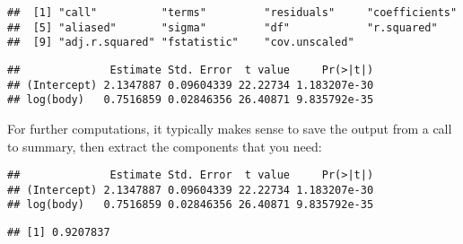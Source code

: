 \documentclass[
]{article}
\newenvironment{Shaded}{\begin{snugshade}}{\end{snugshade}}
\newcommand{\CommentTok}[1]{\textcolor[rgb]{0.56,0.35,0.01}{\textit{#1}}}
\newcommand{\FunctionTok}[1]{\textcolor[rgb]{0.00,0.00,0.00}{#1}}
\newcommand{\NormalTok}[1]{#1}
\newcommand{\OtherTok}[1]{\textcolor[rgb]{0.56,0.35,0.01}{#1}}
\newcommand{\SpecialCharTok}[1]{\textcolor[rgb]{0.00,0.00,0.00}{#1}}
\begin{document}
\begin{verbatim}
##  [1] "call"          "terms"         "residuals"     "coefficients" 
##  [5] "aliased"       "sigma"         "df"            "r.squared"    
##  [9] "adj.r.squared" "fstatistic"    "cov.unscaled"
\end{verbatim}

\begin{Shaded}
\end{Shaded}

\begin{verbatim}
##              Estimate Std. Error  t value     Pr(>|t|)
## (Intercept) 2.1347887 0.09604339 22.22734 1.183207e-30
## log(body)   0.7516859 0.02846356 26.40871 9.835792e-35
\end{verbatim}

For further computations, it typically makes sense to save the output
from a call to summary, then extract the components that you need:

\begin{Shaded}
\end{Shaded}

\begin{verbatim}
##              Estimate Std. Error  t value     Pr(>|t|)
## (Intercept) 2.1347887 0.09604339 22.22734 1.183207e-30
## log(body)   0.7516859 0.02846356 26.40871 9.835792e-35
\end{verbatim}

\begin{Shaded}
\end{Shaded}

\begin{verbatim}
## [1] 0.9207837
\end{verbatim}
\end{document}
